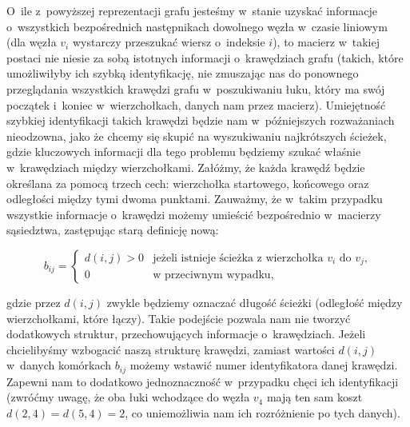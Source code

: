 O~ile z~powyższej reprezentacji grafu jesteśmy w~stanie uzyskać informacje o~wszystkich bezpośrednich następnikach dowolnego węzła w~czasie liniowym (dla węzła $v_{i}$ wystarczy przeszukać wiersz o~indeksie $i$), to macierz w~takiej postaci nie niesie za sobą istotnych informacji o~krawędziach grafu (takich, które umożliwiłyby ich szybką identyfikację, nie zmuszając nas do ponownego przeglądania wszystkich krawędzi grafu w~poszukiwaniu łuku, który ma swój początek i~koniec w~wierzchołkach, danych nam przez macierz).
Umiejętność szybkiej identyfikacji takich krawędzi będzie nam w~późniejszych rozważaniach nieodzowna, jako że chcemy się skupić na wyszukiwaniu najkrótszych ścieżek, gdzie kluczowych informacji dla tego problemu będziemy szukać właśnie w~krawędziach między wierzchołkami.
Załóżmy, że każda krawędź będzie określana za pomocą trzech cech: wierzchołka startowego, końcowego oraz odległości między tymi dwoma punktami.
Zauważmy, że w~takim przypadku wszystkie informacje o~krawędzi możemy umieścić bezpośrednio w~macierzy sąsiedztwa, zastępując starą definicję nową: 

\begin{savenotes}
	\begin{equation}
		b_{ij}= \left\{ 
		\begin{array}{ll}
		 d \left( i, j \right) > 0  & \textrm{jeżeli istnieje ścieżka z wierzchołka $v_{i}$ do $v_{j}$,}\\
		0 & \textrm{w przeciwnym wypadku,}
		\end{array} \right.
	\end{equation}
\end{savenotes}
gdzie przez $d \left( i,j \right)$ zwykle będziemy oznaczać długość ścieżki (odległość między wierzchołkami, które łączy).
Takie podejście pozwala nam nie tworzyć dodatkowych struktur, przechowujących informacje o~krawędziach.
Jeżeli chcielibyśmy wzbogacić naszą strukturę krawędzi, zamiast wartości $d \left( i,j \right)$ w~danych komórkach $b_{ij}$ możemy wstawić numer identyfikatora danej krawędzi.
Zapewni nam to dodatkowo jednoznaczność w~przypadku chęci ich identyfikacji (zwróćmy uwagę, że oba łuki wchodzące do węzła $v_{4}$ mają ten sam koszt $d \left( 2, 4 \right) = d \left( 5, 4 \right) = 2$, co uniemożliwia nam ich rozróżnienie po tych danych).

